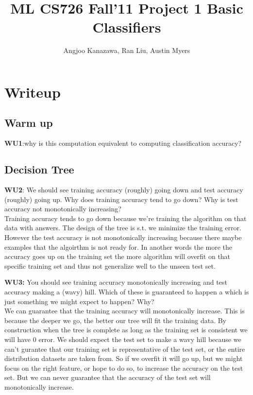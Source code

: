 \documentclass[a4paper]{article}
\begin{document}
\title{ML CS726 Fall'11 Project 1 Basic Classifiers}
\author{Angjoo Kanazawa, Ran Liu, Austin Myers}
\maketitle


\section{Writeup}
\subsection{Warm up}
\textbf{WU1}:why is this computation equivalent to computing classification
accuracy?
\subsection{Decision Tree}
\textbf{WU2}: We should see training accuracy (roughly) going down and
test accuracy (roughly) going up.  Why does training accuracy tend to
go down?  Why is test accuracy not monotonically
increasing?\\
Training accuracy tends to go down because we're training the
algorithm on that data with answers. The design of the tree is s.t. we
minimize the training error. However the test accuracy is not
monotonically increasing because there maybe examples that the
algoirthm is not ready for. In another words the more the accuracy
goes up on the training set the more algorithm will overfit on that
specific training set and thus not generalize well to the unseen test set.

\textbf{WU3:} You should see training accuracy monotonically increasing
and test accuracy making a (wavy) hill.  Which of these
is guaranteed to happen a which is just something we might
expect to happen?  Why?\\
We can guarantee that the training accuracy will monotonically
increase. This is because the deeper we go, the better our tree will
fit the training data. By construction when the tree is complete as
long as the training set is consistent we will have 0 error. We should
expect the test set to make a wavy hill because we can't gurantee that
our training set is representative of the test set, or the entire
distribution datasets are taken from. So if we overfit it will go up,
but we might focus on the right feature, or hope to do so, to increase
the accuracy on the test set. But we can never guarantee that the
accuracy of the test set will monotonically increase.
\end{document}
